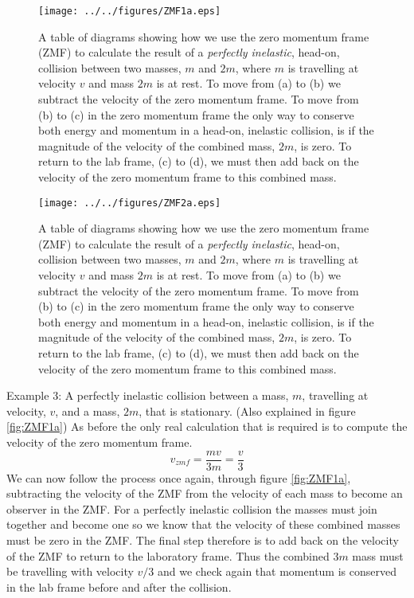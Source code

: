 \begin{wrapfigure}{r}{9.0cm}
\texttt{[image: ../../figures/ZMF1a.eps]}
\caption{A table of diagrams showing how we use the zero momentum frame (ZMF) to calculate the result of a {\it perfectly inelastic}, head-on, collision between two masses, $m$ and $2m$, where $m$ is travelling at velocity $v$ and mass $2m$ is at rest.  To move from (a) to (b) we subtract the velocity of the zero momentum frame.  To move from (b) to (c) in the zero momentum frame the only way to conserve both energy and momentum in a head-on, inelastic collision, is if the magnitude of the velocity of the combined mass, $2m$, is zero.  To return to the lab frame, (c) to (d), we must then add back on the velocity of the zero momentum frame to this combined mass.} \label{fig:ZMF1a} \vspace{1.5cm}
\texttt{[image: ../../figures/ZMF2a.eps]}
\caption{A table of diagrams showing how we use the zero momentum frame (ZMF) to calculate the result of a {\it perfectly inelastic}, head-on, collision between two masses, $m$ and $2m$, where $m$ is travelling at velocity $v$ and mass $2m$ is at rest.  To move from (a) to (b) we subtract the velocity of the zero momentum frame.  To move from (b) to (c) in the zero momentum frame the only way to conserve both energy and momentum in a head-on, inelastic collision, is if the magnitude of the velocity of the combined mass, $2m$, is zero.  To return to the lab frame, (c) to (d), we must then add back on the velocity of the zero momentum frame to this combined mass.} \label{fig:ZMF2a} \vspace{-1.0cm}
\end{wrapfigure}
\noindent Example 3: A perfectly inelastic collision between a mass, $m$, travelling at velocity, $v$, and a mass, $2m$, that is stationary. (Also explained in figure \ref{fig:ZMF1a})\nll
As before the only real calculation that is required is to compute the velocity of the zero momentum frame.
\begin{equation}
v_{zmf}=\frac{mv}{3m}=\frac{v}{3}
\end{equation}
We can now follow the process once again, through figure \ref{fig:ZMF1a}, subtracting the velocity of the ZMF from the velocity of each mass to become an observer in the ZMF.  For a perfectly inelastic collision the masses must join together and become one so we know that the velocity of these combined masses must be zero in the ZMF.  The final step therefore is to add back on the velocity of the ZMF to return to the laboratory frame.  Thus the combined $3m$ mass must be travelling with velocity $v/3$ and we check again that momentum is conserved in the lab frame before and after the collision.\\

